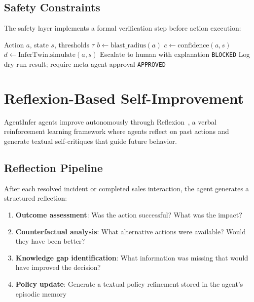 \documentclass[conference,10pt,letterpaper]{IEEEtran}
\begin{document}
\subsection{Safety Constraints}

The safety layer implements a formal verification step before action execution:

\begin{algorithm}[!t]
\caption{Action Safety Verification}
\label{alg:safety}
\begin{algorithmic}[1]
\REQUIRE Action $a$, state $s$, thresholds $\tau$
\STATE $b \leftarrow \text{blast\_radius}(a)$
\STATE $c \leftarrow \text{confidence}(a, s)$
\STATE $d \leftarrow \text{InferTwin.simulate}(a, s)$ 
    \STATE Escalate to human with explanation
    \RETURN \texttt{BLOCKED}
\ENDIF
{}
    \STATE Log dry-run result; require meta-agent approval
\ENDIF
\RETURN \texttt{APPROVED}
\end{algorithmic}
\end{algorithm}


\section{Reflexion-Based Self-Improvement}
\label{sec:reflexion}

AgentInfer agents improve autonomously through Reflexion~\cite{shinn2023reflexion}, a verbal reinforcement learning framework where agents reflect on past actions and generate textual self-critiques that guide future behavior.

\subsection{Reflection Pipeline}

After each resolved incident or completed sales interaction, the agent generates a structured reflection:

\begin{enumerate}
\item \textbf{Outcome assessment}: Was the action successful? What was the impact?
\item \textbf{Counterfactual analysis}: What alternative actions were available? Would they have been better?
\item \textbf{Knowledge gap identification}: What information was missing that would have improved the decision?
\item \textbf{Policy update}: Generate a textual policy refinement stored in the agent's episodic memory
\end{enumerate}
\end{document}
